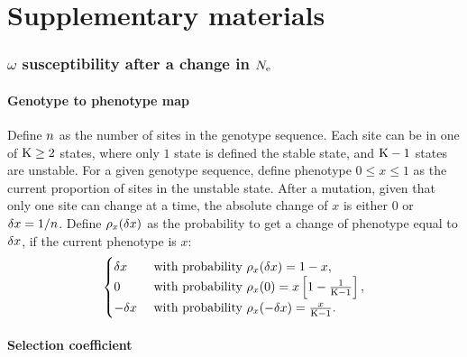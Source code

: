 \documentclass{article}
\begin{document}
    \part*{Supplementary materials}
    \tableofcontents
    
\section{\texorpdfstring{$\omega$}{ω} susceptibility after a change in \texorpdfstring{$N_{\text{e}}$}{Nₑ}}
\label{sec:susceptibility-after-a-change-in-Ne}

\subsection{Genotype to phenotype map}
\label{subsec:genotype-to-phenotype-map}

Define $n$ as the number of sites in the genotype sequence.
Each site can be in one of $\text{K} \geq 2$ states, where only $1$ state is defined the stable state, and $\text{K} - 1$ states are unstable.
For a given genotype sequence, define {phenotype} $0 \leq x \leq 1$ as the current proportion of sites in the unstable state.
After a mutation, given that only one site can change at a time, the absolute change of $x$ is either $0$ or $\delta x=1/n$.
Define $\rho_{x}(\delta x)$ as the probability to get a change of {phenotype} equal to $\delta x$, if the current {phenotype} is $x$:
\begin{gather}
    \begin{cases}
        \delta x &\text{ with probability } \rho_{x}(\delta x) = 1-x, \\
        0 &\text{ with probability } \rho_{x}(0) = x \left[1 - \frac{1}{\text{K} - 1}\right], \\
        -\delta x &\text{ with probability } \rho_{x}(-\delta x) = \frac{x}{\text{K} - 1}.\\
    \end{cases} \label{eq:proba-pheno}
\end{gather}

\subsection{Selection coefficient}
\label{subsec:selection-coefficient}
\end{document}
